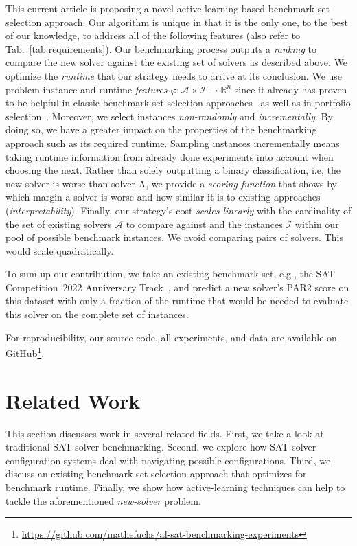 \documentclass[runningheads]{llncs}
\begin{document}
This current article is proposing a novel active-learning-based benchmark-set-selection approach.
Our algorithm is unique in that it is the only one, to the best of our knowledge, to address all of the following features (also refer to Tab.~\ref{tab:requirements}).
Our benchmarking process outputs a \textit{ranking} to compare the new solver against the existing set of solvers as described above.
We optimize the \textit{runtime} that our strategy needs to arrive at its conclusion.
We use problem-instance and runtime \textit{features} $\varphi\!: \mathcal{A} \times \mathcal{I} \rightarrow \mathbb{R}^n$ since it already has proven to be helpful in classic benchmark-set-selection approaches~\cite{HoosKSS13} as well as in portfolio selection~\cite{CollauttiMMO13,NgokoCT19}.
Moreover, we select instances \textit{non-randomly} and \textit{incrementally}.
By doing so, we have a greater impact on the properties of the benchmarking approach such as its required runtime.
Sampling instances incrementally means taking runtime information from already done experiments into account when choosing the next.
Rather than solely outputting a binary classification, i.e, the new solver is worse than solver A, we provide a \textit{scoring function} that shows by which margin a solver is worse and how similar it is to existing approaches (\textit{interpretability}).
Finally, our strategy's cost \textit{scales linearly} with the cardinality of the set of existing solvers $\mathcal{A}$ to compare against and the instances $\mathcal{I}$ within our pool of possible benchmark instances.
We avoid comparing pairs of solvers.
This would scale quadratically.

To sum up our contribution, we take an existing benchmark set, e.g., the SAT Competition~2022 Anniversary Track~\cite{sat2022}, and predict a new solver's PAR2 score on this dataset with only a fraction of the runtime that would be needed to evaluate this solver on the complete set of instances.

For reproducibility, our source code, all experiments, and data are available on GitHub\footnote{\url{https://github.com/mathefuchs/al-sat-benchmarking-experiments}}.


\section{Related Work}
This section discusses work in several related fields.
First, we take a look at traditional SAT-solver benchmarking.
Second, we explore how SAT-solver configuration systems deal with navigating possible configurations.
Third, we discuss an existing benchmark-set-selection approach that optimizes for benchmark runtime.
Finally, we show how active-learning techniques can help to tackle the aforementioned \textit{new-solver} problem.
\end{document}
